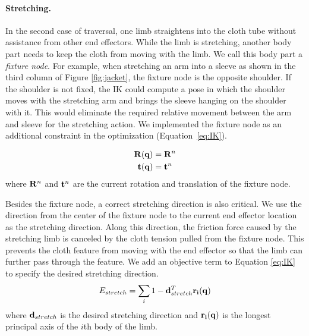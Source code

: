 \paragraph{Stretching.} In the second case of traversal, one limb straightens into the cloth tube without assistance from other end effectors. While the limb is stretching, another body part needs to keep the cloth from moving with the limb. We call this body part a \emph{fixture node}. For example, when stretching an arm into a sleeve as shown in the third column of Figure \ref{fig:jacket}, the fixture node is the opposite shoulder. If the shoulder is not fixed, the IK could compute a pose in which the shoulder moves with the stretching arm and brings the sleeve hanging on the shoulder with it. This would eliminate the required relative movement between the arm and sleeve for the stretching action. We implemented the fixture node as an additional constraint in the optimization (Equation~\ref{eq:IK}).

\begin{align}
  \label{eq:fixtureNode}
  \mathbf{R}(\mathbf{q})& = \mathbf{R}^n\\
  \nonumber  \mathbf{t}(\mathbf{q})& = \mathbf{t}^n
\end{align}
where $\mathbf{R}^n$ and $\mathbf{t}^n$ are the current rotation and translation of the fixture node. 

Besides the fixture node, a correct stretching direction is also critical. We use the direction from the center of the fixture node to the current end effector location as the stretching direction. Along this direction, the friction force caused by the stretching limb is canceled by the cloth tension pulled from the fixture node. This prevents the cloth feature from moving with the end effector so that the limb can further pass through the feature. We add an objective term to Equation \ref{eq:IK} to specify the desired stretching direction.
\begin{equation}
  E_{stretch} = \sum_i1 - \mathbf{d}_{stretch}^T\mathbf{r_i(q)}
  \label{eq:stretching}
\end{equation}
where $\mathbf{d}_{stretch}$ is the desired stretching direction and $\mathbf{r_i(q)}$ is the longest principal axis of the $i$th body of the limb.

